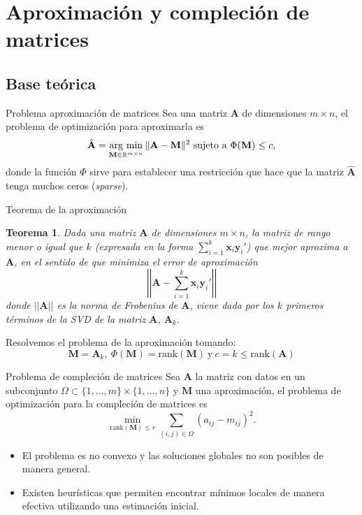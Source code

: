 \documentclass{beamer}
\newtheorem{teor}{Teorema}[section]
\newcommand{\argmin}{\operatornamewithlimits{arg\ min}}
\newcommand{\normleft}{\left|\left|}
\newcommand{\normright}{\right|\right|}
\begin{document}
\section{Aproximación y compleción de matrices}
\subsection{Base teórica}
\begin{frame}{Problema aproximación de matrices}
Sea una matriz $\mathbf{A}$ de dimensiones $m \times n$, el problema de optimización para aproximarla es
\begin{equation*}
    \hat{\mathbf{A}} =\argmin_{\mathbf{M} \in \mathbb{R}^{m \times n}} \| \mathbf{A} - \mathbf{M} \|^2 \mathrm{\ sujeto\ a\ }\Phi(\mathbf{M}) \leq c,
\end{equation*}
donde la función $\Phi$ sirve para establecer una restricción que hace que la matriz $\hat{\mathbf{A}}$ tenga muchos ceros (\textit{sparse}).
\end{frame}

\begin{frame}{Teorema de la aproximación}
\begin{teor}
    Dada una matriz $\mathbf{A}$ de dimensiones $m \times n$, la matriz de rango menor o igual que $k$ (expresada en la forma $\sum_{i=1}^{k} \mathbf{x}_i \mathbf{y}_i'$)
    que mejor aproxima a $\mathbf{A}$, en el sentido de que minimiza el error de aproximación
    \begin{equation*}
        \normleft \mathbf{A} -  \sum_{i=1}^{k} \mathbf{x}_i \mathbf{y}_i' \normright
    \end{equation*}
    donde $\normleft \mathbf{A} \normright$ es la norma de Frobenius de $\mathbf{A}$, viene dada por los $k$ primeros términos de la SVD de la matriz $\mathbf{A}$, $\mathbf{A}_k$.
\end{teor}

Resolvemos el problema de la aproximación tomando:
\begin{equation*}
    \mathbf{M} = \mathbf{A}_k,\  \Phi(\mathbf{M}) = \mbox{rank}(\mathbf{M}) \mathrm{\ y\ } c = k \leq \mbox{rank}(\mathbf{A})
\end{equation*}
\end{frame}

\begin{frame}{Problema de compleción de matrices}
Sea $\mathbf{A}$ la matriz con datos en un subconjunto $\Omega \subset \{1, \ldots, m\} \times \{1, \ldots, n\}$ y $\textbf{M}$ una aproximación,  el problema de optimización para la compleción de matrices es
\begin{equation*}
    \min_{\mbox{rank}(\mathbf{M}) \leq r} \sum_{(i,j) \in \Omega} (a_{ij} -  m_{ij})^2.
\end{equation*}
\begin{itemize}
    \item El problema es no convexo y las soluciones globales no son posibles de manera general.
    \item Existen heurísticas que permiten encontrar mínimos locales de manera efectiva utilizando una estimación inicial.
\end{itemize}
    
\end{frame}
\end{document}
